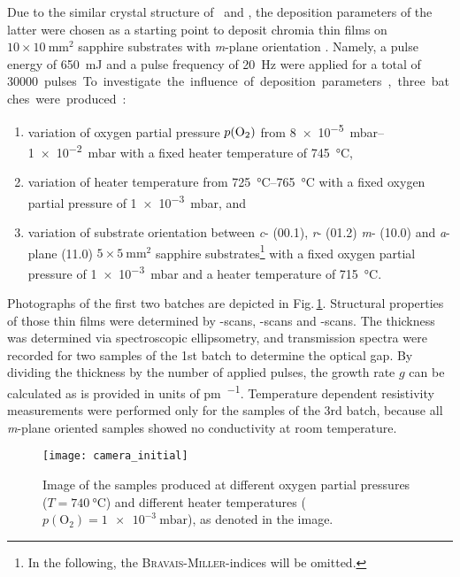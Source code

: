 Due to the similar crystal structure of \cro\ and \agao, the deposition parameters of the latter were chosen as a starting point to deposit chromia thin films on $10\times\qty{10}{\mm\squared}$ sapphire substrates with \textit{m}-plane orientation
    \cite{petersen2023}.
Namely, a pulse energy of \qty{650}{mJ} and a pulse frequency of \qty{20}{\Hz} were applied for a total of \qty{30000} pulses.
To investigate the influence of deposition parameters, three batches were produced:
\begin{enumerate}
    \item variation of oxygen partial pressure $p(\ce{O2})$ from \qtyrange{8e-5}{1e-2}{mbar} with a fixed heater temperature of \qty{745}{\degreeCelsius},
    \item variation of heater temperature from \qtyrange{725}{765}{\degreeCelsius} with a fixed oxygen partial pressure of \qty{1e-3}{mbar}, and
    \item variation of substrate orientation between \textit{c}- (00.1), \textit{r}- (01.2) \textit{m}- (10.0) and \textit{a}-plane (11.0) $5\times\qty{5}{\mm\squared}$ sapphire substrates\footnote{
        In the following, the \textsc{Bravais}-\textsc{Miller}-indices will be omitted.
        }
    with a fixed oxygen partial pressure of \qty{1e-3}{mbar} and a heater temperature of \qty{715}{\degreeCelsius}.
\end{enumerate}
Photographs of the first two batches are depicted in Fig.\,\ref{Fig:Results_1_samplesPhoto}.
Structural properties of those thin films were determined by \thetaomega-scans, \textomega-scans and \textphi-scans.
The thickness was determined via spectroscopic ellipsometry, and transmission spectra were recorded for two samples of the 1st batch to determine the optical gap.
By dividing the thickness by the number of applied pulses, the growth rate $g$ can be calculated as is provided in units of \unit{\pm\per\pulse}.
Temperature dependent resistivity measurements were performed only for the samples of the 3rd batch, because all \textit{m}-plane oriented samples showed no conductivity at room temperature.

\begin{figure}
    \centering
    \texttt{[image: camera\_initial]}
    \caption{
        Image of the samples produced at different oxygen partial pressures ($T=\qty{740}{\degreeCelsius}$) and different heater temperatures ($p(\mathrm{O_2})=\qty{1e-3}{\milli\bar}$), as denoted in the image.
    }
    \label{Fig:Results_1_samplesPhoto}
\end{figure}